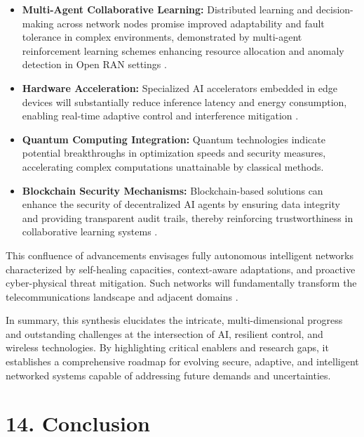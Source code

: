 \documentclass[11pt]{article}
\begin{document}
\begin{itemize}
\begin{itemize}
    \item \textbf{Multi-Agent Collaborative Learning:} Distributed learning and decision-making across network nodes promise improved adaptability and fault tolerance in complex environments, demonstrated by multi-agent reinforcement learning schemes enhancing resource allocation and anomaly detection in Open RAN settings \cite{ref49}.
    \item \textbf{Hardware Acceleration:} Specialized AI accelerators embedded in edge devices will substantially reduce inference latency and energy consumption, enabling real-time adaptive control and interference mitigation \cite{ref50}.
    \item \textbf{Quantum Computing Integration:} Quantum technologies indicate potential breakthroughs in optimization speeds and security measures, accelerating complex computations unattainable by classical methods.
    \item \textbf{Blockchain Security Mechanisms:} Blockchain-based solutions can enhance the security of decentralized AI agents by ensuring data integrity and providing transparent audit trails, thereby reinforcing trustworthiness in collaborative learning systems \cite{ref54}.
\end{itemize}

This confluence of advancements envisages fully autonomous intelligent networks characterized by self-healing capacities, context-aware adaptations, and proactive cyber-physical threat mitigation. Such networks will fundamentally transform the telecommunications landscape and adjacent domains \cite{ref55}.

\bigskip

In summary, this synthesis elucidates the intricate, multi-dimensional progress and outstanding challenges at the intersection of AI, resilient control, and wireless technologies. By highlighting critical enablers and research gaps, it establishes a comprehensive roadmap for evolving secure, adaptive, and intelligent networked systems capable of addressing future demands and uncertainties.


\section*{14. Conclusion}


\end{itemize}
\end{document}
